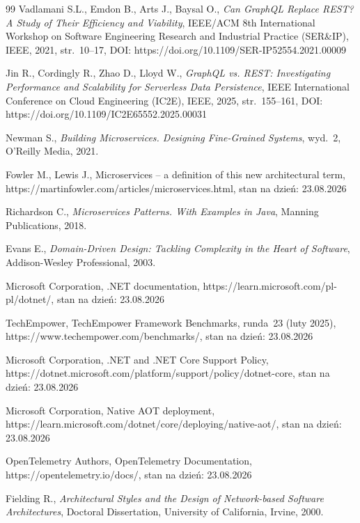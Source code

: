 \documentclass{PracaDyplomowa}
\begin{document}
\begin{thebibliography}{99}
 Vadlamani S.L., Emdon B., Arts J., Baysal O., \textit{Can GraphQL Replace REST? A Study of Their Efficiency and Viability}, IEEE/ACM 8th International Workshop on Software Engineering Research and Industrial Practice (SER\&IP), IEEE, 2021, str.~10--17, DOI: https://doi.org/10.1109/SER-IP52554.2021.00009

 Jin R., Cordingly R., Zhao D., Lloyd W., \textit{GraphQL vs. REST: Investigating Performance and Scalability for Serverless Data Persistence}, IEEE International Conference on Cloud Engineering (IC2E), IEEE, 2025, str.~155--161, DOI: https://doi.org/10.1109/IC2E65552.2025.00031


\newpage
{} Newman S., \textit{Building Microservices. Designing Fine-Grained Systems}, wyd.~2, O'Reilly Media, 2021.

 Fowler M., Lewis J., Microservices -- a definition of this new architectural term, https://martinfowler.com/articles/microservices.html, stan na dzień: 23.08.2026

 Richardson C., \textit{Microservices Patterns. With Examples in Java}, Manning Publications, 2018.

 Evans E., \textit{Domain-Driven Design: Tackling Complexity in the Heart of Software}, Addison-Wesley Professional, 2003.

 Microsoft Corporation, .NET documentation, https://learn.microsoft.com/pl-pl/dotnet/, stan na dzień: 23.08.2026

 TechEmpower, TechEmpower Framework Benchmarks, runda~23 (luty 2025), https://www.techempower.com/benchmarks/, stan na dzień: 23.08.2026

 Microsoft Corporation, .NET and .NET Core Support Policy, https://dotnet.microsoft.com/platform/support/policy/dotnet-core, stan na dzień: 23.08.2026

 Microsoft Corporation, Native AOT deployment, https://learn.microsoft.com/dotnet/core/deploying/native-aot/, stan na dzień: 23.08.2026

 OpenTelemetry Authors, OpenTelemetry Documentation, https://opentelemetry.io/docs/, stan na dzień: 23.08.2026


 Fielding R., \textit{Architectural Styles and the Design of Network-based Software Architectures}, Doctoral Dissertation, University of California, Irvine, 2000.


\end{thebibliography}
\end{document}
